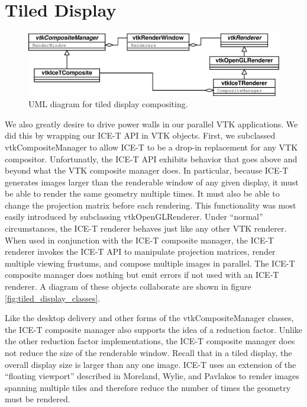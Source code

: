 \documentclass[twocolumn]{article}
\begin{document}
\section{Tiled Display}
\label{sec:tiled_display}

\begin{figure}
  \begin{center}
    \includegraphics[scale=0.23]{images/IceTCompositeClasses}
  \end{center}
  \caption{UML diagram for tiled display compositing.}
  \label{fig:tiled_display_classes}
\end{figure}

We also greatly desire to drive power walls in our parallel VTK
applications.  We did this by wrapping our ICE-T API in VTK objects.
First, we subclassed vtkCompositeManager to allow ICE-T to be a drop-in
replacement for any VTK compositor.  Unfortunatly, the ICE-T API exhibits
behavior that goes above and beyond what the VTK composite manager does.
In particular, because ICE-T generates images larger than the renderable
window of any given display, it must be able to render the same geometry
multiple times.  It must also be able to change the projection matrix
before each rendering.  This functionality was most easily introduced by
subclassing vtkOpenGLRenderer.  Under ``normal'' circumstances, the ICE-T
renderer behaves just like any other VTK renderer.  When used in
conjunction with the ICE-T composite manager, the ICE-T renderer invokes
the ICE-T API to manipulate projection matrices, render multiple viewing
frustums, and compose multiple images in parallel.  The ICE-T composite
manager does nothing but emit errors if not used with an ICE-T renderer.  A
diagram of these objects collaborate are shown in figure
\vref{fig:tiled_display_classes}.

Like the desktop delivery and other forms of the vtkCompositeManager
classes, the ICE-T composite manager also supports the idea of a reduction
factor.  Unlike the other reduction factor implementations, the ICE-T
composite manager does not reduce the size of the renderable window.
Recall that in a tiled display, the overall display size is larger than any
one image.  ICE-T uses an extension of the ``floating viewport'' described
in Moreland, Wylie, and Pavlakos \cite{Moreland01} to render images
spanning multiple tiles and therefore reduce the number of times the
geometry must be rendered.
\end{document}
